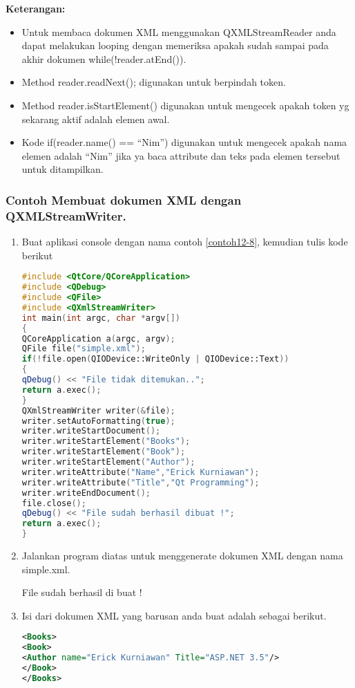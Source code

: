 \textbf{Keterangan:}

\begin{itemize}

\item
  Untuk membaca dokumen XML menggunakan QXMLStreamReader anda dapat
  melakukan looping dengan memeriksa apakah sudah sampai pada akhir
  dokumen while(!reader.atEnd()).
\item
  Method reader.readNext(); digunakan untuk berpindah token.
\item
  Method reader.isStartElement() digunakan untuk mengecek apakah token
  yg sekarang aktif adalah elemen awal.
\item
  Kode if(reader.name() == ``Nim'') digunakan untuk mengecek apakah nama
  elemen adalah ``Nim'' jika ya baca attribute dan teks pada elemen
  tersebut untuk ditampilkan.
\end{itemize}

\subsubsection*{Contoh  Membuat dokumen XML dengan QXMLStreamWriter.}

\begin{enumerate}

\item
  Buat aplikasi console dengan nama contoh \ref{contoh12-8}, kemudian tulis kode
  berikut

\begin{lstlisting}[language=c++, caption=Membuat dokumen XML dengan QXMLStreamWriter, label=contoh12-9]
#include <QtCore/QCoreApplication>
#include <QDebug>
#include <QFile>
#include <QXmlStreamWriter>
int main(int argc, char *argv[])
{
QCoreApplication a(argc, argv);
QFile file("simple.xml");
if(!file.open(QIODevice::WriteOnly | QIODevice::Text))
{
qDebug() << "File tidak ditemukan..";
return a.exec();
}
QXmlStreamWriter writer(&file);
writer.setAutoFormatting(true);
writer.writeStartDocument();
writer.writeStartElement("Books");
writer.writeStartElement("Book");
writer.writeStartElement("Author");
writer.writeAttribute("Name","Erick Kurniawan");
writer.writeAttribute("Title","Qt Programming");
writer.writeEndDocument();
file.close();
qDebug() << "File sudah berhasil dibuat !";
return a.exec();
}
\end{lstlisting}
\item
  Jalankan program diatas untuk menggenerate dokumen XML dengan nama
  simple.xml.
  \begin{lcverbatim}
File sudah berhasil di buat !
  \end{lcverbatim}
\item
  Isi dari dokumen XML yang barusan anda buat adalah sebagai berikut.

\begin{lstlisting}[language=xml]
<Books>
<Book>
<Author name="Erick Kurniawan" Title="ASP.NET 3.5"/>
</Book>
</Books>
\end{lstlisting}

\end{enumerate}

